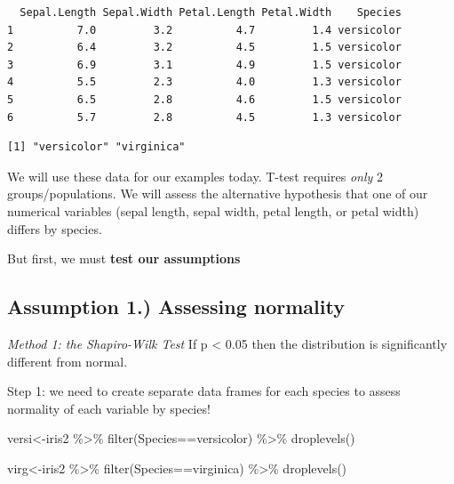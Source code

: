 \documentclass[
  letterpaper,
  DIV=11,
  numbers=noendperiod]{scrartcl}
\newenvironment{Shaded}{\begin{snugshade}}{\end{snugshade}}
\newcommand{\FunctionTok}[1]{\textcolor[rgb]{0.28,0.35,0.67}{#1}}
\newcommand{\NormalTok}[1]{\textcolor[rgb]{0.00,0.23,0.31}{#1}}
\newcommand{\OtherTok}[1]{\textcolor[rgb]{0.00,0.23,0.31}{#1}}
\newcommand{\SpecialCharTok}[1]{\textcolor[rgb]{0.37,0.37,0.37}{#1}}
\newcommand{\StringTok}[1]{\textcolor[rgb]{0.13,0.47,0.30}{#1}}
\begin{document}
\begin{verbatim}
  Sepal.Length Sepal.Width Petal.Length Petal.Width    Species
1          7.0         3.2          4.7         1.4 versicolor
2          6.4         3.2          4.5         1.5 versicolor
3          6.9         3.1          4.9         1.5 versicolor
4          5.5         2.3          4.0         1.3 versicolor
5          6.5         2.8          4.6         1.5 versicolor
6          5.7         2.8          4.5         1.3 versicolor
\end{verbatim}

\begin{Shaded}
\end{Shaded}

\begin{verbatim}
[1] "versicolor" "virginica" 
\end{verbatim}

We will use these data for our examples today. T-test requires
\emph{only} 2 groups/populations. We will assess the alternative
hypothesis that one of our numerical variables (sepal length, sepal
width, petal length, or petal width) differs by species.

But first, we must \textbf{test our assumptions}

\hypertarget{assumption-1.-assessing-normality}{%
\subsection{\texorpdfstring{\textbf{Assumption 1.) Assessing
normality}}{Assumption 1.) Assessing normality}}\label{assumption-1.-assessing-normality}}

\emph{Method 1: the Shapiro-Wilk Test} If p \textless{} 0.05 then the
distribution is significantly different from normal.

Step 1: we need to create separate data frames for each species to
assess normality of each variable by species!

\begin{Shaded}
\begin{Highlighting}[]
\NormalTok{versi}\OtherTok{\textless{}{-}}\NormalTok{iris2 }\SpecialCharTok{\%\textgreater{}\%}
  \FunctionTok{filter}\NormalTok{(Species}\SpecialCharTok{==}\StringTok{\textquotesingle{}versicolor\textquotesingle{}}\NormalTok{) }\SpecialCharTok{\%\textgreater{}\%}
  \FunctionTok{droplevels}\NormalTok{()}

\NormalTok{virg}\OtherTok{\textless{}{-}}\NormalTok{iris2 }\SpecialCharTok{\%\textgreater{}\%}
  \FunctionTok{filter}\NormalTok{(Species}\SpecialCharTok{==}\StringTok{\textquotesingle{}virginica\textquotesingle{}}\NormalTok{) }\SpecialCharTok{\%\textgreater{}\%}
  \FunctionTok{droplevels}\NormalTok{()}
\end{Highlighting}
\end{Shaded}
\end{document}
